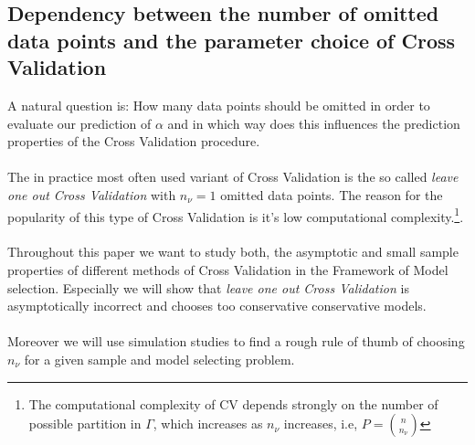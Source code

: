 \documentclass[Research_Module_ES.tex]{subfiles}
\begin{document}
\subsection{Dependency between the number of omitted data points and the  parameter choice of Cross Validation}
A natural question is: How many data points should be omitted in order to evaluate our prediction of $\alpha$ and in which way does this influences the prediction properties of the Cross Validation procedure.\\
\\
The in practice most often used variant of Cross Validation is the so called {\itshape leave one out Cross Validation} with $n_\nu=1$ omitted data points. The reason for the popularity of this type of Cross Validation is it's low computational complexity.\footnote{The computational complexity of CV depends strongly on the number of possible partition in $\Gamma$, which increases as $n_\nu$ increases, i.e, $P=\binom{n}{n_\nu}$}.\\
\\
Throughout this paper we want to study both, the asymptotic and small sample properties of different methods of Cross Validation in the Framework of Model selection. Especially we will show that {\itshape leave one out Cross Validation} is asymptotically incorrect and chooses too conservative conservative models.\\
\\
Moreover we will use simulation studies to find a rough rule of thumb of choosing $n_\nu$ for a given sample and model selecting problem.
\end{document}
